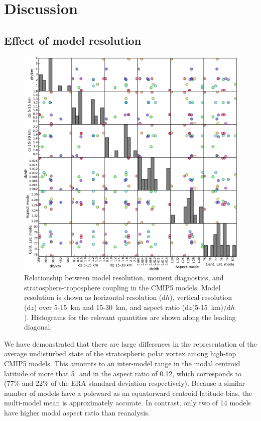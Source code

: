 \section{Discussion}
\subsection{Effect of model resolution}


\begin{figure}
 \centering
 \noindent\includegraphics[width=\textwidth]{figures/chapter-models/scatter_matrix.pdf}
 \caption[Relationship between model resolution and moment diagnostics in the
 CMIP5 models.]{Relationship between model resolution, moment diagnostics, and
   stratosphere-troposphere coupling in the CMIP5 models. Model resolution is
   shown as horizontal resolution ($\mathrm{d}h$), vertical resolution
   ($\mathrm{d}z$) over 5-15~km and 15-30~km, and aspect ratio
   ($\mathrm{d}z$(5-15~km)$ / \mathrm{d}h$). Histograms for the relevant
   quantities are shown along the leading diagonal.}
 \label{fig:scatter_matrix}
\end{figure}

We have demonstrated that there are large differences in the representation of
the average undisturbed state of the stratospheric polar vortex among high-top
CMIP5 models. This amounts to an inter-model range in the modal centroid
latitude of more that 5$^{\circ}$ and in the aspect ratio of 0.12, which
corresponds to (77\% and 22\% of the ERA standard deviation
respectively). Because a similar number of models have a poleward as an
equatorward centroid latitude bias, the multi-model mean is approximately
accurate. In contrast, only two of 14 models have higher modal aspect ratio than
reanalysis.

